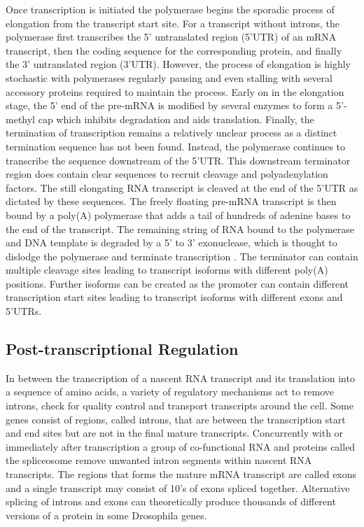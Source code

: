 \documentclass[../main.tex]{subfiles}
\begin{document}
Once transcription is initiated the polymerase begins the sporadic process of elongation from the transcript start site.
For a transcript without introns, the polymerase first transcribes the 5' untranslated region (5'UTR) of an mRNA transcript, then the coding sequence for the corresponding protein, and finally the 3' untranslated region (3'UTR).
However, the process of elongation is highly stochastic with polymerases regularly pausing and even stalling with several accessory proteins required to maintain the process.
Early on in the elongation stage, the 5' end of the pre-mRNA is modified by several enzymes to form a 5'-methyl cap which inhibits degradation and aids translation.
Finally, the termination of transcription remains a relatively unclear process as a distinct termination sequence has not been found.
Instead, the polymerase continues to transcribe the sequence downstream of the 5'UTR.
This downstream terminator region does contain clear sequences to recruit cleavage and polyadenylation factors. 
The still elongating RNA transcript is cleaved at the end of the 5'UTR as dictated by these sequences.
The freely floating pre-mRNA transcript is then bound by a poly(A) polymerase that adds a tail of hundreds of adenine bases to the end of the transcript.
The remaining string of RNA bound to the polymerase and DNA template is degraded by a 5' to 3' exonuclease, which is thought to dislodge the polymerase and terminate transcription \parencite{Alberts2017}.
The terminator can contain multiple cleavage sites leading to transcript isoforms with different poly(A) positions.
Further isoforms can be created as the promoter can contain different transcription start sites leading to transcript isoforms with different exons and 5'UTRs.

\subsection{Post-transcriptional Regulation}

In between the transcription of a nascent RNA transcript and its translation into a sequence of amino acids, a variety of regulatory mechanisms act to remove introns, check for quality control and transport transcripts around the cell.
Some genes consist of regions, called introns, that are between the transcription start and end sites but are not in the final mature transcripts.
Concurrently with or immediately after transcription a group of co-functional RNA and proteins called the spliceosome remove unwanted intron segments within nascent RNA transcripts.
The regions that forms the mature mRNA transcript are called exons and a single transcript may consist of 10's of exons spliced together.
Alternative splicing of introns and exons can theoretically produce thousands of different versions of a protein in some Drosophila genes.
\end{document}
